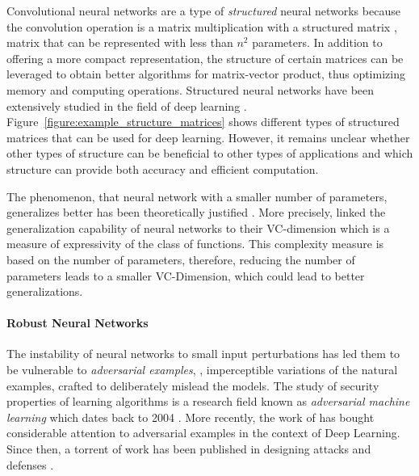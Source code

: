 Convolutional neural networks are a type of \emph{structured} neural networks because the convolution operation is a matrix multiplication with a structured matrix \ie, matrix that can be represented with less than $n^2$ parameters. 
In addition to offering a more compact representation, the structure of certain matrices can be leveraged to obtain better algorithms for matrix-vector product, thus optimizing memory and computing operations. 
Structured neural networks have been extensively studied in the field of deep learning \cite{moczulski2015acdc,sindhwani2015structured,NIPS2013_5025}.
Figure~\ref{figure:example_structure_matrices} shows different types of structured matrices that can be used for deep learning.
However, it remains unclear whether other types of structure can be beneficial to other types of applications and which structure can provide both accuracy and efficient computation.

The phenomenon, that neural network with a smaller number of parameters, generalizes better has been theoretically justified \cite{vapnik1982estimation}.
More precisely, \citeauthor{vapnik1982estimation} linked the generalization capability of neural networks to their VC-dimension which is a measure of expressivity of the class of functions.
This complexity measure is based on the number of parameters, therefore, reducing the number of parameters leads to a smaller VC-Dimension, which could lead to better generalizations.



\paragraph{Robust Neural Networks}

The instability of neural networks to small input perturbations has led them to be vulnerable to \emph{adversarial examples}, \ie, imperceptible variations of the natural examples, crafted to deliberately mislead the models.
The study of security properties of learning algorithms is a research field known as \emph{adversarial machine learning} which dates back to 2004 \cite{dalvi2004adversarial}.
More recently, the work of \citet{Szegedy2013IntriguingPO} has bought considerable attention to adversarial examples in the context of Deep Learning.
Since then, a torrent of work has been published in designing attacks and defenses \cite{Szegedy2013IntriguingPO,goodfellow2014explaining,papernot2016limitations,madry2018towards,carlini2017towards,pinot2019theoretical}.


